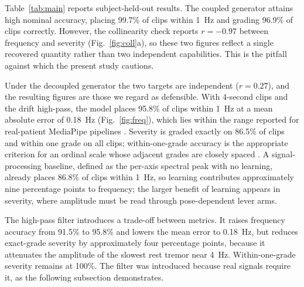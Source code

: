 \documentclass[conference]{IEEEtran}
\begin{document}
Table~\ref{tab:main} reports subject-held-out results. The coupled generator
attains high nominal accuracy, placing 99.7\% of clips within 1~Hz and grading
96.9\% of clips correctly. However, the collinearity check reports $r=-0.97$
between frequency and severity (Fig.~\ref{fig:coll}a), so these two figures reflect
a single recovered quantity rather than two independent capabilities. This is the
pitfall against which the present study cautions.

Under the decoupled generator the two targets are independent ($r=0.27$), and the
resulting figures are those we regard as defensible. With 4-second clips and the
drift high-pass, the model places 95.8\% of clips within 1~Hz at a mean absolute
error of 0.18~Hz (Fig.~\ref{fig:freq}), which lies within the range reported for
real-patient MediaPipe pipelines \cite{guney2022,friedrich2024}. Severity is graded
exactly on 86.5\% of clips and within one grade on all clips; within-one-grade
accuracy is the appropriate criterion for an ordinal scale whose adjacent grades
are closely spaced \cite{zhang2021}. A signal-processing baseline, defined as the
per-axis spectral peak with no learning, already places 86.8\% of clips within
1~Hz, so learning contributes approximately nine percentage points to frequency;
the larger benefit of learning appears in severity, where amplitude must be read
through pose-dependent lever arms.

\begin{table}[t]
\caption{Subject-held-out results. ``Coupled'' denotes the pipeline's own
labelling and is included only to expose the collinearity. ``+HP'' denotes the
drift high-pass filter.}
\label{tab:main}
\centering
\setlength{\tabcolsep}{4pt}
\end{table}

The high-pass filter introduces a trade-off between metrics. It raises frequency
accuracy from 91.5\% to 95.8\% and lowers the mean error to 0.18~Hz, but reduces
exact-grade severity by approximately four percentage points, because it attenuates
the amplitude of the slowest rest tremor near 4~Hz. Within-one-grade severity
remains at 100\%. The filter was introduced because real signals require it, as the
following subsection demonstrates.
\end{document}
